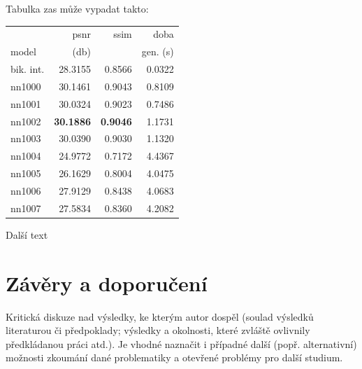 			Tabulka zas může vypadat takto:

			\begin{table}[hbt!]
				\centering
				\begin{tabular}{| l | r | r | r | }
					\hline
					&        psnr &      ssim &      doba  \\
					model &       (db)    &           & gen. (s) \\
					\hline
					bik. int. & 28.3155 & 0.8566 & 0.0322 \\
					nn1000    & 30.1461 & 0.9043 & 0.8109 \\
					nn1001    & 30.0324 & 0.9023 & 0.7486 \\
					nn1002    & \textbf{30.1886} & \textbf{0.9046} & 1.1731 \\
					nn1003    & 30.0390 & 0.9030 & 1.1320 \\
					nn1004    & 24.9772 & 0.7172 & 4.4367 \\
					nn1005    & 26.1629 & 0.8004 & 4.0475 \\
					nn1006    & 27.9129 & 0.8438 & 4.0683 \\
					nn1007    & 27.5834 & 0.8360 & 4.2082 \\
					\hline
				\end{tabular}
			\end{table}

			\newpage

			Další text

\section{Závěry a doporučení}


Kritická diskuze nad výsledky, ke kterým autor dospěl (soulad výsledků  literaturou či předpoklady;
výsledky a okolnosti, které zvláště ovlivnily předkládanou práci atd.). Je vhodné naznačit i případné další
(popř. alternativní) možnosti zkoumání dané problematiky a otevřené problémy pro další studium.

